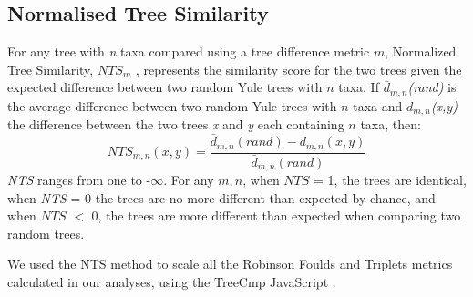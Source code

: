 \documentclass[12pt,letterpaper]{article}
\begin{document}
\subsection{Normalised Tree Similarity}
For any tree with \textit{n} taxa compared using a tree difference metric $m$, Normalized Tree Similarity, $NTS_m$ \citep{Bogdanowicz2012}, represents the similarity score for the two trees given the expected difference between two random Yule trees \citep{Bogdanowicz2012} with $n$ taxa. If $\bar{d}_{m,n}$\textit{(rand)} is the average difference between two random Yule trees with $n$ taxa and $d_{m,n}$\textit{(x,y)} the difference between the two trees \textit{x} and \textit{y} each containing $n$ taxa, then:
\begin{equation}
NTS_{m,n}(x,y)=\frac{\bar{d}_{m,n}(rand) - d_{m,n}(x,y)} {\bar{d}_{m,n}(rand)}
\end{equation}
\textit{NTS} ranges from one to -$\infty$.
For any $m,n$, when $NTS$ = 1, the trees are identical, when \textit{NTS} = 0 the trees are no more different than expected by chance, and when $NTS$ $<$ 0, the trees are more different than expected when comparing two random trees. 

We used the NTS method to scale all the Robinson Foulds and Triplets metrics calculated in our analyses, using the TreeCmp JavaScript \citep{Bogdanowicz2012}.
\end{document}
